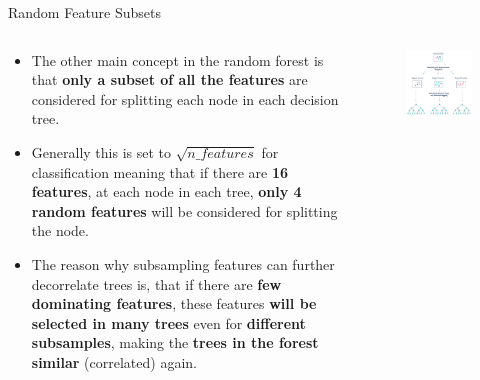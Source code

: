 \documentclass[document.tex]{subfiles}
\begin{document}
    \begin{frame}{Random Feature Subsets}
        \begin{columns}
            \begin{column}{0.6\textwidth}
                \begin{itemize}
                    \item The other main concept in the random forest is that \textbf{only a subset of all the features} are considered for splitting each node in each decision tree. 
                    \item Generally this is set to $\sqrt{n\_features}$ for classification meaning that if there are \textbf{16 features}, at each node in each tree, \textbf{only 4 random features} will be considered for splitting the node.
                    \item The reason why subsampling features can further decorrelate trees is, that if there are \textbf{few dominating features}, these features \textbf{will be selected in many trees} even for \textbf{different subsamples}, making the \textbf{trees in the forest similar} (correlated) again.
                \end{itemize}
            \end{column}
            \begin{column}{0.4\textwidth}
                \begin{figure}
                    \label{fig:random-forest-2}
                    \includegraphics[width=\textwidth, cframe=gray]{figures/external/random-forest-2.png}
                \end{figure}
            \end{column}
        \end{columns}
    \end{frame}
\end{document}
